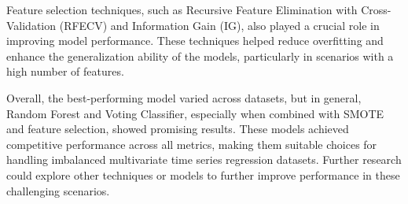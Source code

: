 \documentclass[12pt]{report}
\begin{document}
Feature selection techniques, such as Recursive Feature Elimination with
Cross-Validation (RFECV) and Information Gain (IG), also played a crucial role
in improving model performance. These techniques helped reduce overfitting and
enhance the generalization ability of the models, particularly in scenarios
with a high number of features.

Overall, the best-performing model varied across datasets, but in general,
Random Forest and Voting Classifier, especially when combined with SMOTE and
feature selection, showed promising results. These models achieved competitive
performance across all metrics, making them suitable choices for handling
imbalanced multivariate time series regression datasets. Further research could
explore other techniques or models to further improve performance in these
challenging scenarios.



\end{document}
